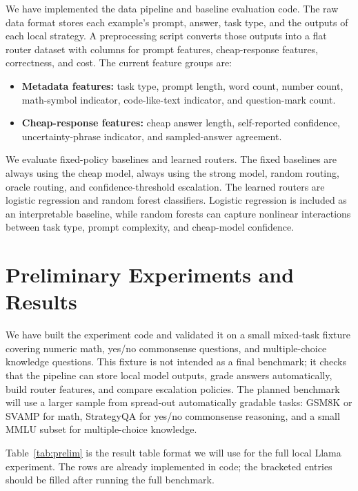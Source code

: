 \documentclass{article}
\begin{document}
We have implemented the data pipeline and baseline evaluation code. The raw data format stores each example's prompt, answer, task type, and the outputs of each local strategy. A preprocessing script converts those outputs into a flat router dataset with columns for prompt features, cheap-response features, correctness, and cost. The current feature groups are:
\begin{itemize}
    \item \textbf{Metadata features:} task type, prompt length, word count, number count, math-symbol indicator, code-like-text indicator, and question-mark count.
    \item \textbf{Cheap-response features:} cheap answer length, self-reported confidence, uncertainty-phrase indicator, and sampled-answer agreement.
\end{itemize}

We evaluate fixed-policy baselines and learned routers. The fixed baselines are always using the cheap model, always using the strong model, random routing, oracle routing, and confidence-threshold escalation. The learned routers are logistic regression and random forest classifiers. Logistic regression is included as an interpretable baseline, while random forests can capture nonlinear interactions between task type, prompt complexity, and cheap-model confidence.

\section{Preliminary Experiments and Results}

We have built the experiment code and validated it on a small mixed-task fixture covering numeric math, yes/no commonsense questions, and multiple-choice knowledge questions. This fixture is not intended as a final benchmark; it checks that the pipeline can store local model outputs, grade answers automatically, build router features, and compare escalation policies. The planned benchmark will use a larger sample from spread-out automatically gradable tasks: GSM8K or SVAMP for math, StrategyQA for yes/no commonsense reasoning, and a small MMLU subset for multiple-choice knowledge.

Table~\ref{tab:prelim} is the result table format we will use for the full local Llama experiment. The rows are already implemented in code; the bracketed entries should be filled after running the full benchmark.
\end{document}

